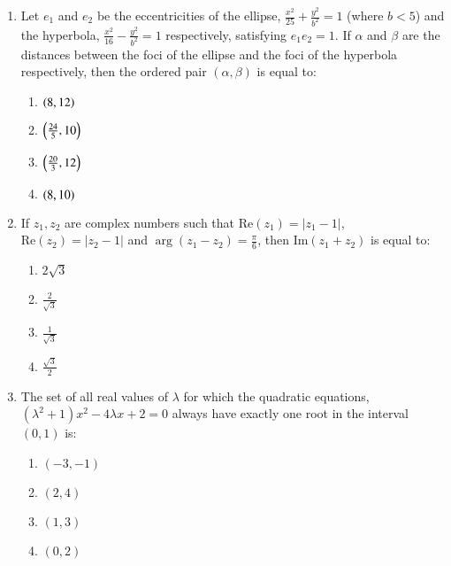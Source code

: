 \documentclass[journal,9pt,twocolumn]{IEEEtran}
\begin{document}
\begin{enumerate}
\item  Let $e_1$ and $e_2$ be the eccentricities of the ellipse, $\frac{x^2}{25} + \frac{y^2}{b^2} = 1$ (where $b < 5$) and the hyperbola, $\frac{x^2}{16} - \frac{y^2}{b^2} = 1$ respectively, satisfying $e_1 e_2 = 1$. If $\alpha$ and $\beta$ are the distances between the foci of the ellipse and the foci of the hyperbola respectively, then the ordered pair $(\alpha, \beta)$ is equal to:
        \begin{multicols}{2}

\begin{enumerate}
    \item $\left(8, 12\right)$
    \item $\left(\frac{24}{5}, 10\right)$
    \item $\left(\frac{20}{3}, 12\right)$
    \item $\left(8, 10\right)$
\end{enumerate}
\end{multicols}

\item If $z_1, z_2$ are complex numbers such that $\text{Re}(z_1) = |z_1 - 1|$, $\text{Re}(z_2) = |z_2 - 1|$ and $\arg(z_1 - z_2) = \frac{\pi}{6}$, then $\text{Im}(z_1 + z_2)$ is equal to:
        \begin{multicols}{4}

\begin{enumerate}
    \item $2\sqrt{3}$
    \item $\frac{2}{\sqrt{3}}$
    \item $\frac{1}{\sqrt{3}}$
    \item $\frac{\sqrt{3}}{2}$
\end{enumerate}
\end{multicols}

\item The set of all real values of $\lambda$ for which the quadratic equations, $(\lambda^2 + 1)x^2 - 4\lambda x + 2 = 0$ always have exactly one root in the interval $(0, 1)$ is:
        
        \begin{multicols}{2}
\begin{enumerate}
    \item $(-3, -1)$
    \item $(2, 4)$
    \item $(1, 3)$
    \item $(0, 2)$
\end{enumerate}
\end{multicols}


\end{enumerate}
\end{document}

